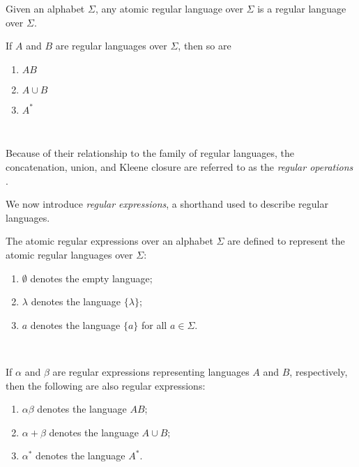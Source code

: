 \documentclass{bcthesis}
\renewcommand{\meo}[1]{}
\newcommand{\footcite}[2]{\xspace\cite[pg.~{#2}]{#1}\xspace}
\begin{document}
	\begin{definition}
		Given an alphabet $\Sigma$, any atomic regular language over $\Sigma$ is a regular language over $\Sigma$.
		
		If $A$ and $B$ are regular languages over $\Sigma$, then so are 
		\begin{enumerate}[label=(\roman*), itemsep = -0.3 ex, nolistsep]
			\item $AB$
			\item $A \cup B$
			\item $A^*$
		\end{enumerate}
		\footcite{rosen}{879}~\meo{todo: something about this citation}
	\end{definition}

	\begin{remark}
		Because of their relationship to the family of regular languages, the concatenation, union, and Kleene closure are referred to as the \textit{regular operations} \footcite{salomaa}{26}.
	\end{remark}

	We now introduce \textit{regular expressions}, a shorthand used to describe regular languages.

	\begin{definition}
		The atomic regular expressions over an alphabet $\Sigma$ are defined to represent the atomic regular languages over $\Sigma$:
		\begin{enumerate}[label=(\roman*), itemsep = -0.3 ex, nolistsep]
			\item $\emptyset$ denotes the empty language;
			\item $\lambda$ denotes the language $\{ \lambda \}$;
			\item $a$ denotes the language $\{ a \}$ for all $a \in \Sigma$.
		\end{enumerate}
		\footcite{hopcroft}{28--29}~\meo{todo: something about this citation}

		If $\alpha$ and $\beta$ are regular expressions representing languages $A$ and $B$, respectively, then the following are also regular expressions:
		\begin{enumerate}[label=(\roman*), itemsep = -0.3 ex, nolistsep]
			\item $\alpha \beta$ denotes the language $AB$;
			\item $\alpha + \beta$ denotes the language $A \cup B$;
			\item $\alpha^*$ denotes the language $A^*$.
		\end{enumerate}
		\footcite{hopcroft}{28--29}~\meo{todo: something about this citation}
	\end{definition}
\end{document}
